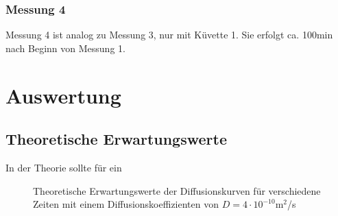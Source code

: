 \documentclass[12pt,a4paper,titlepage,headinclude,bibtotoc]{scrartcl}
\begin{document}
\subsubsection*{Messung 4}
Messung 4 ist analog zu Messung 3, nur mit Küvette 1.
Sie erfolgt ca. 100min nach Beginn von Messung 1.


\section{Auswertung}
\label{sec:auswertung}
\subsection{Theoretische Erwartungswerte}
In der Theorie sollte für ein
\begin{figure}[!h]
 \centering
 
\caption{Theoretische Erwartungswerte der Diffusionskurven für verschiedene Zeiten mit einem Diffusionskoeffizienten von $D=4\cdot 10^{-10}$m$^2$/s}
\end{figure}
\end{document}
